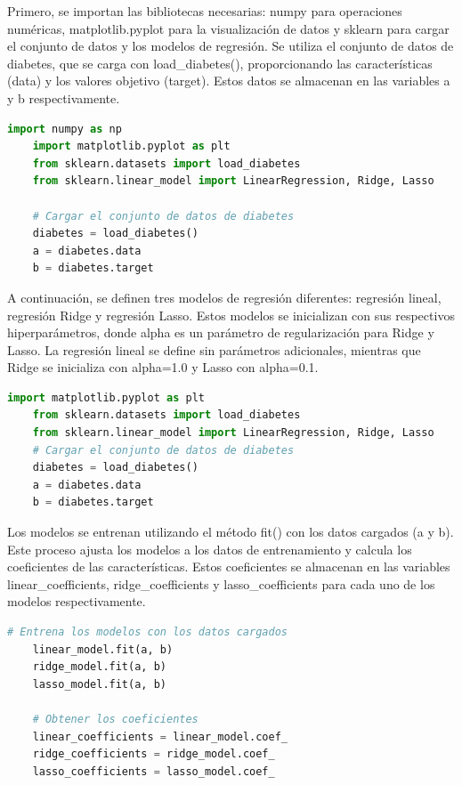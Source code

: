 \documentclass[12pt]{article}
\begin{document}
	Primero, se importan las bibliotecas necesarias: numpy para operaciones numéricas, matplotlib.pyplot para la visualización de datos y sklearn para cargar el conjunto de datos y los modelos de regresión. Se utiliza el conjunto de datos de diabetes, que se carga con load\_diabetes(), proporcionando las características (data) y los valores objetivo (target). Estos datos se almacenan en las variables a y b respectivamente.
	
	\begin{lstlisting}[language=Python]
	import numpy as np
	import matplotlib.pyplot as plt
	from sklearn.datasets import load_diabetes
	from sklearn.linear_model import LinearRegression, Ridge, Lasso
	
	# Cargar el conjunto de datos de diabetes
	diabetes = load_diabetes()
	a = diabetes.data
	b = diabetes.target
	\end{lstlisting}
	
	A continuación, se definen tres modelos de regresión diferentes: regresión lineal, regresión Ridge y regresión Lasso. Estos modelos se inicializan con sus respectivos hiperparámetros, donde alpha es un parámetro de regularización para Ridge y Lasso. La regresión lineal se define sin parámetros adicionales, mientras que Ridge se inicializa con alpha=1.0 y Lasso con alpha=0.1.
	
	\begin{lstlisting}[language=Python] 
	import matplotlib.pyplot as plt
	from sklearn.datasets import load_diabetes
	from sklearn.linear_model import LinearRegression, Ridge, Lasso
	# Cargar el conjunto de datos de diabetes
	diabetes = load_diabetes()
	a = diabetes.data
	b = diabetes.target
	\end{lstlisting}
	
	Los modelos se entrenan utilizando el método fit() con los datos cargados (a y b). Este proceso ajusta los modelos a los datos de entrenamiento y calcula los coeficientes de las características. Estos coeficientes se almacenan en las variables linear\_coefficients, ridge\_coefficients y lasso\_coefficients para cada uno de los modelos respectivamente.
	
	\begin{lstlisting}[language=Python]
	# Entrena los modelos con los datos cargados
	linear_model.fit(a, b)
	ridge_model.fit(a, b)
	lasso_model.fit(a, b)
	
	# Obtener los coeficientes
	linear_coefficients = linear_model.coef_
	ridge_coefficients = ridge_model.coef_
	lasso_coefficients = lasso_model.coef_
	\end{lstlisting}
	
\end{document}

